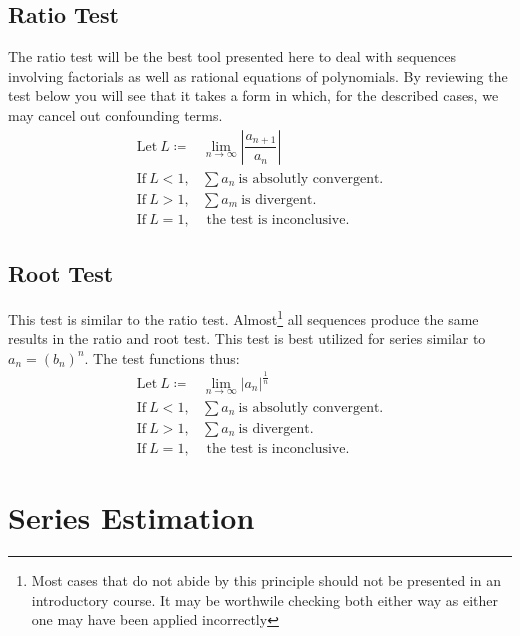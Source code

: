 \documentclass[11pt]{article}
\newcommand{\define}{\coloneqq}
\newcommand{\abs}[1]{\left| #1 \right|}
\begin{document}
	\subsection*{Ratio Test}
		The ratio test will be the best tool presented here to deal with sequences involving factorials as well as rational equations of polynomials.
		By reviewing the test below you will see that it takes a form in which, for the described cases, we may cancel out confounding terms.
			\begin{align}
				\text{Let} \ L \define &\lim_{n\to\infty} \abs{\dfrac{a_{n+1}}{a_n}} \\
				\text{If} \ L < 1, &\sum a_n \ \text{is absolutly convergent.} \\
				\text{If} \ L > 1, &\sum a_m \ \text{is divergent.} \\
				\text{If} \ L = 1, &\text{ the test is inconclusive.}
			\end{align}

	\subsection*{Root Test}
		This test is similar to the ratio test. Almost\footnote{Most cases that do not abide by this principle should not be presented
		in an introductory course. It may be worthwile checking both either way as either one may have been applied incorrectly} 
		all sequences produce the same results in the ratio and root test. This test is best utilized for series similar to
		$a_n = (b_n)^n$. The test functions thus:
			\begin{align}
				\text{Let} \ L \define &\lim_{n\to\infty} \abs{a_n}^{\frac{1}{n}} \\
				\text{If} \ L < 1, &\sum a_n \ \text{is absolutly convergent.} \\
				\text{If} \ L > 1, &\sum a_n \ \text{is divergent.} \\
				\text{If} \ L = 1, &\text{ the test is inconclusive.}
			\end{align}

\section*{Series Estimation}
\end{document}
